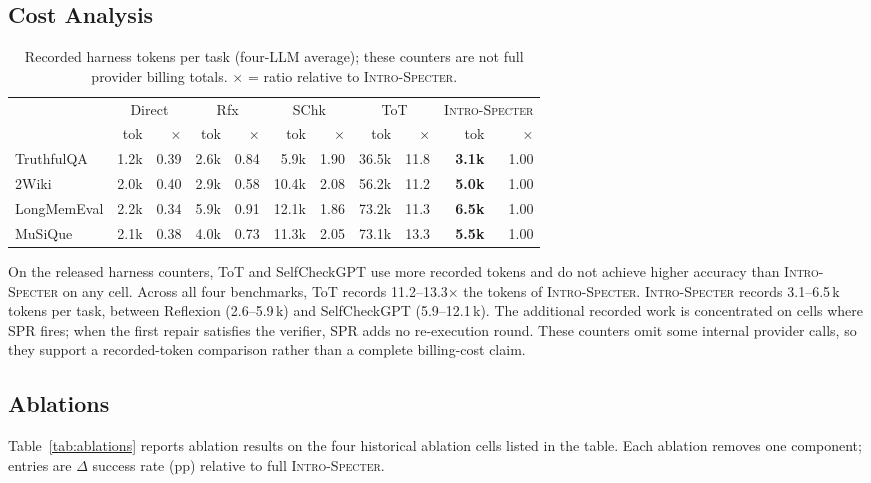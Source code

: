 \documentclass{article}
\newcommand{\method}{\textsc{Intro-Specter}\xspace}
\begin{document}
\subsection{Cost Analysis}\label{sec:cost}
\begin{table}[t]\centering\small
\caption{Recorded harness tokens per task (four-LLM average); these counters are not full provider billing totals. $\times$ = ratio relative to \method.}
\label{tab:cost-full}\setlength{\tabcolsep}{3pt}
\begin{tabular}{l rr rr rr rr rr}\toprule
& \multicolumn{2}{c}{Direct} & \multicolumn{2}{c}{Rfx} & \multicolumn{2}{c}{SChk} & \multicolumn{2}{c}{ToT} & \multicolumn{2}{c}{\method} \\
\cmidrule(lr){2-3}\cmidrule(lr){4-5}\cmidrule(lr){6-7}\cmidrule(lr){8-9}\cmidrule(lr){10-11}
& tok & $\times$ & tok & $\times$ & tok & $\times$ & tok & $\times$ & tok & $\times$ \\\midrule
TruthfulQA  & 1.2k & 0.39 & 2.6k & 0.84 & 5.9k & 1.90 & 36.5k & 11.8 & \textbf{3.1k} & 1.00 \\
2Wiki       & 2.0k & 0.40 & 2.9k & 0.58 & 10.4k & 2.08 & 56.2k & 11.2 & \textbf{5.0k} & 1.00 \\
LongMemEval & 2.2k & 0.34 & 5.9k & 0.91 & 12.1k & 1.86 & 73.2k & 11.3 & \textbf{6.5k} & 1.00 \\
MuSiQue     & 2.1k & 0.38 & 4.0k & 0.73 & 11.3k & 2.05 & 73.1k & 13.3 & \textbf{5.5k} & 1.00 \\
\bottomrule\end{tabular}\end{table}

On the released harness counters, ToT and SelfCheckGPT use more recorded tokens and do not achieve higher accuracy than \method on any cell. Across all four benchmarks, ToT records 11.2--13.3$\times$ the tokens of \method. \method records 3.1--6.5\,k tokens per task, between Reflexion (2.6--5.9\,k) and SelfCheckGPT (5.9--12.1\,k). The additional recorded work is concentrated on cells where SPR fires; when the first repair satisfies the verifier, SPR adds no re-execution round. These counters omit some internal provider calls, so they support a recorded-token comparison rather than a complete billing-cost claim.

\subsection{Ablations}\label{sec:ablations}

Table~\ref{tab:ablations} reports ablation results on the four historical ablation cells listed in the table. Each ablation removes one component; entries are $\Delta$ success rate (pp) relative to full \method.
\end{document}
